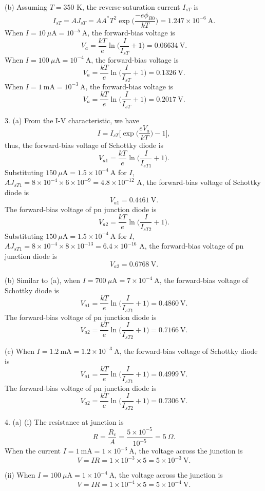 \documentclass[a4paper]{article}
\begin{document}
(b) Assuming $T=350$ K, the reverse-saturation current $I_{sT}$ is
$$I_{sT}=AJ_{sT}=AA^*T^2\exp{\bigg(\frac{-e\phi_{B0}}{kT}\bigg)}=1.247\times10^{-6}\ \mathrm{A}.$$
When $I=10\ \mu\mathrm{A}=10^{-5}\ \mathrm{A}$, the forward-bias voltage is
$$V_a=\frac{kT}{e}\ln{\bigg(\frac{I}{I_{sT}}+1\bigg)}=0.06634\ \mathrm{V}.$$
When $I=100\ \mu\mathrm{A}=10^{-4}\ \mathrm{A}$, the forward-bias voltage is
$$V_a=\frac{kT}{e}\ln{\bigg(\frac{I}{I_{sT}}+1\bigg)}=0.1326\ \mathrm{V}.$$
When $I=1\ \mathrm{mA}=10^{-3}\ \mathrm{A}$, the forward-bias voltage is
$$V_a=\frac{kT}{e}\ln{\bigg(\frac{I}{I_{sT}}+1\bigg)}=0.2017\ \mathrm{V}.$$

3. (a) From the I-V characteristic, we have
$$I=I_{sT}\bigg[\exp{\bigg(\frac{eV_a}{kT}\bigg)-1}\bigg],$$
thus, the forward-bias voltage of Schottky diode is
$$V_{a1}=\frac{kT}{e}\ln{\bigg(\frac{I}{I_{sT1}}+1\bigg)}.$$
Substituting $150\ \mu\mathrm{A}=1.5\times10^{-4}\ \mathrm{A}$ for $I$, $AJ_{sT1}=8\times10^{-4}\times6\times10^{-9}=4.8\times10^{-12}$ A, the forward-bias voltage of Schottky diode is
$$V_{a1}=0.4461\ \mathrm{V}.$$
The forward-bias voltage of pn junction diode is
$$V_{a2}=\frac{kT}{e}\ln{\bigg(\frac{I}{I_{sT2}}+1\bigg)}.$$
Substituting $150\ \mu\mathrm{A}=1.5\times10^{-4}\ \mathrm{A}$ for $I$, $AJ_{sT1}=8\times10^{-4}\times8\times10^{-13}=6.4\times10^{-16}$ A, the forward-bias voltage of pn junction diode is
$$V_{a2}=0.6768\ \mathrm{V}.$$

(b) Similar to (a), when $I=700\ \mu\mathrm{A}=7\times10^{-4}\ \mathrm{A}$, the forward-bias voltage of Schottky diode is
$$V_{a1}=\frac{kT}{e}\ln{\bigg(\frac{I}{I_{sT1}}+1\bigg)}=0.4860\ \mathrm{V}.$$
The forward-bias voltage of pn junction diode is
$$V_{a2}=\frac{kT}{e}\ln{\bigg(\frac{I}{I_{sT2}}+1\bigg)}=0.7166\ \mathrm{V}.$$

(c) When $I=1.2\ \mathrm{mA}=1.2\times10^{-3}\ \mathrm{A}$, the forward-bias voltage of Schottky diode is
$$V_{a1}=\frac{kT}{e}\ln{\bigg(\frac{I}{I_{sT1}}+1\bigg)}=0.4999\ \mathrm{V}.$$
The forward-bias voltage of pn junction diode is
$$V_{a2}=\frac{kT}{e}\ln{\bigg(\frac{I}{I_{sT2}}+1\bigg)}=0.7306\ \mathrm{V}.$$

4. (a) (i) The resistance at junction is
$$R=\frac{R_c}{A}=\frac{5\times10^{-5}}{10^{-5}}=5\ \Omega.$$
When the current $I=1\ \mathrm{mA}=1\times10^{-3}\ \mathrm{A}$, the voltage across the junction is
$$V=IR=1\times10^{-3}\times5=5\times10^{-3}\ \mathrm{V}.$$

(ii) When $I=100\ \mu\mathrm{A}=1\times10^{-4}\ \mathrm{A}$, the voltage across the junction is
$$V=IR=1\times10^{-4}\times5=5\times10^{-4}\ \mathrm{V}.$$
\end{document}
